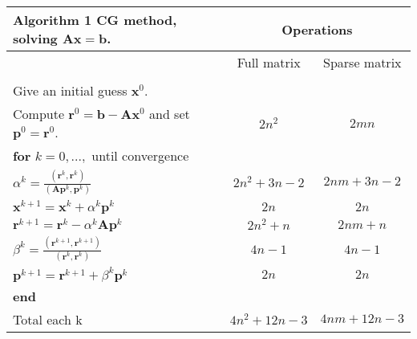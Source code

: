 \documentclass[a4paper,10pt]{report}
\begin{document}
 \begin{table}[!h]
\begin{tabular}{ |l|c|c| } 
\hline
  \textbf{Algorithm 1} CG method, solving $\mathbf{A}\mathbf{x}=\mathbf{b}$.& \multicolumn{2}{|c|}{Operations}\\
  \hline
&Full matrix&Sparse matrix\\
 \hline
&&\\
Give an initial guess $\mathbf{x}^0$. &&\\
Compute $\mathbf{r}^0=\mathbf{b}-\mathbf{A}\mathbf{x}^0$ and set $\mathbf{p}^0=\mathbf{r}^0$.&$2n^2$&$2mn$\\
\hline
\hspace{0.5cm}\textbf{for} $k=0,...,$ until convergence&&\\
 \hspace{1cm} $\alpha^k=\frac{(\mathbf{r}^{k},\mathbf{r}^{k})}{(\mathbf{A}\mathbf{p}^k,\mathbf{p}^k)}$&$2n^2+3n-2$&$2nm+3n-2$\\
\hspace{1cm} $\mathbf{x}^{k+1}=\mathbf{x}^k+\alpha^k\mathbf{p}^k$&$2n$&$2n$\\
\hspace{1cm}$\mathbf{r}^{k+1}=\mathbf{r}^k-\alpha^k\mathbf{A}\mathbf{p}^k$&$2n^2+n$&$2nm+n$\\
\hspace{1cm}$ \beta^k=\frac{(\mathbf{r}^{k+1},\mathbf{r}^{k+1})}{(\mathbf{r}^k,\mathbf{r}^k)}$&$4n-1$&$4n-1$\\
\hspace{1cm}$\mathbf{p}^{k+1}=\mathbf{r}^{k+1}+\beta^k\mathbf{p}^k$&$2n$&$2n$\\
\hspace{0.5cm}\textbf{end}&&\\
\hline
Total each k&$4n^2+12n-3$&$4nm+12n-3$\\
\hline
\end{tabular}
\end{table}
\end{document}
